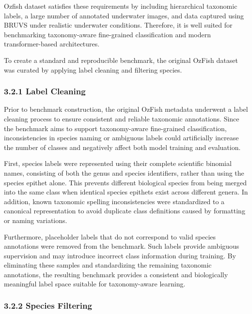 \documentclass[preprint,12pt]{elsarticle}
\begin{document}
Ozfish dataset satisfies these requirements by including hierarchical
taxonomic labels, a large number of annotated underwater images, and
data captured using BRUVS under realistic underwater conditions.
Therefore, it is well suited for benchmarking taxonomy-aware
fine-grained classification and modern transformer-based architectures.

To create a standard and reproducible benchmark, the original OzFish
dataset was curated by applying label cleaning and filtering species.

\subsubsection*{\texorpdfstring{3.2.1 Label Cleaning
}{3.2.1 Label Cleaning }}\label{label-cleaning}

Prior to benchmark construction, the original OzFish metadata underwent
a label cleaning process to ensure consistent and reliable taxonomic
annotations. Since the benchmark aims to support taxonomy-aware
fine-grained classification, inconsistencies in species naming or
ambiguous labels could artificially increase the number of classes and
negatively affect both model training and evaluation.

First, species labels were represented using their complete scientific
binomial names, consisting of both the genus and species identifiers,
rather than using the species epithet alone. This prevents different
biological species from being merged into the same class when identical
species epithets exist across different genera. In addition, known
taxonomic spelling inconsistencies were standardized to a canonical
representation to avoid duplicate class definitions caused by formatting
or naming variations.

Furthermore, placeholder labels that do not correspond to valid species
annotations were removed from the benchmark. Such labels provide
ambiguous supervision and may introduce incorrect class information
during training. By eliminating these samples and standardizing the
remaining taxonomic annotations, the resulting benchmark provides a
consistent and biologically meaningful label space suitable for
taxonomy-aware learning.

\subsubsection*{\texorpdfstring{3.2.2 Species Filtering
}{3.2.2 Species Filtering }}\label{species-filtering}
\end{document}
